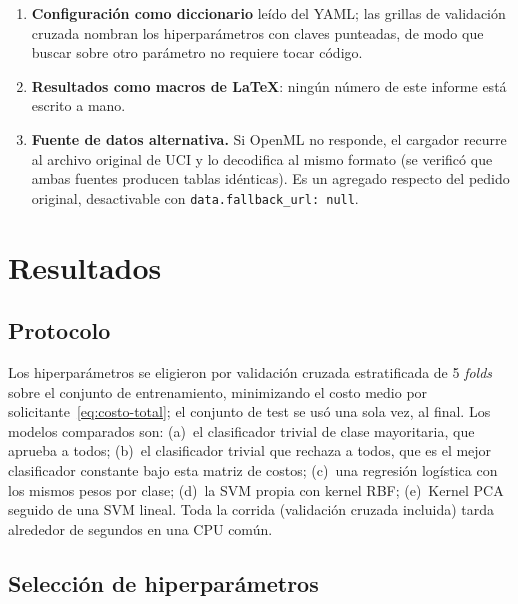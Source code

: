 \documentclass[11pt,a4paper]{article}
\newcommand{\code}[1]{\texttt{#1}}
\theoremstyle{plain}
\theoremstyle{definition}
\theoremstyle{remark}
\numberwithin{equation}{section}
\begin{document}
\begin{enumerate}
  \item \textbf{Configuración como diccionario} leído del YAML; las grillas de validación
        cruzada nombran los hiperparámetros con claves punteadas, de modo que buscar sobre
        otro parámetro no requiere tocar código.
  \item \textbf{Resultados como macros de \LaTeX}: ningún número de este informe está
        escrito a mano.
  \item \textbf{Fuente de datos alternativa.} Si OpenML no responde, el cargador recurre al
        archivo original de UCI y lo decodifica al mismo formato (se verificó que ambas
        fuentes producen tablas idénticas). Es un agregado respecto del pedido original,
        desactivable con \code{data.fallback\_url: null}.
\end{enumerate}

\section{Resultados}\label{sec:resultados}

\subsection{Protocolo}

Los hiperparámetros se eligieron por validación cruzada estratificada de 5 \emph{folds}
sobre el conjunto de entrenamiento, minimizando el costo medio por
solicitante~\eqref{eq:costo-total}; el conjunto de test se usó una sola vez, al final. Los
modelos comparados son: (a)~el clasificador trivial de clase mayoritaria, que aprueba a
todos; (b)~el clasificador trivial que rechaza a todos, que es el mejor clasificador
constante bajo esta matriz de costos; (c)~una regresión logística con los mismos pesos por
clase; (d)~la SVM propia con kernel RBF; (e)~Kernel PCA seguido de una SVM lineal. Toda la
corrida (validación cruzada incluida) tarda alrededor de \ResRuntime{} segundos en una CPU
común.

\subsection{Selección de hiperparámetros}

\begin{table}[H]
  \centering
  \small
  
  \caption{Hiperparámetros elegidos por validación cruzada y su desempeño medio en los
  \emph{folds} de validación (costo por solicitante).}
  \label{tab:cv}
\end{table}
\end{document}
